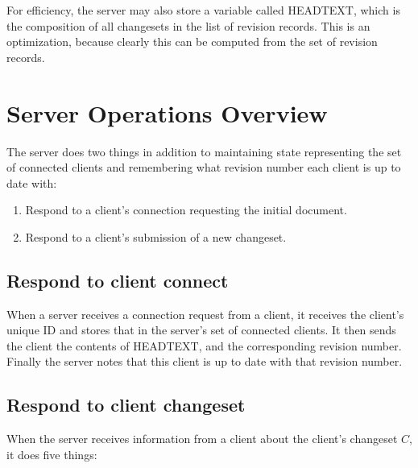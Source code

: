 \documentclass{article}
\begin{document}
For efficiency, the server may also store a variable
called HEADTEXT, which is the composition of all
changesets in the list of revision records.  This is an
optimization, because clearly this can be computed from
the set of revision records.

\section{Server Operations Overview}

The server does two things in addition to maintaining
state representing the set of connected clients and
remembering what revision number each client is up to date
with:

\begin{enumerate}
\item Respond to a client's connection requesting the initial document.
\item Respond to a client's submission of a new changeset.
\end{enumerate}

\subsection{Respond to client connect}
When a server receives a connection request from a client,
it receives the client's unique ID and stores that in the
server's set of connected clients.  It then sends the
client the contents of HEADTEXT, and the corresponding
revision number.  Finally the server notes that this
client is up to date with that revision number.

\subsection{Respond to client changeset}

When the server receives information from a client about
the client's changeset $C$, it does five things:
\end{document}
